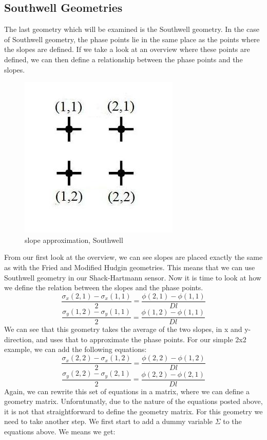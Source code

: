 \documentclass{article}
\begin{document}
\subsection{Southwell Geometries}
The last geometry which will be examined is the Southwell geometry. In the case of Southwell geometry, the phase points lie in the same place as the points where the slopes are defined. If we take a look at an overview where these points are defined, we can then define a relationship between the phase points and the slopes.
\newpage
\begin{figure}[h!]
  \centering
  \includegraphics[scale=0.6]{figures/southwell}
  \caption{slope approximation, Southwell}
\end{figure}
\noindent From our first look at the overview, we can see slopes are placed exactly the same as with the Fried and Modified Hudgin geometries. This means that we can use Southwell geometry in our Shack-Hartmann sensor. 
\newline
\newline
Now it is time to look at how we define the relation between the slopes and the phase points. 
$$ \frac{\sigma_x(2,1)-\sigma_x(1,1)}{2} = \frac{\phi(2,1)-\phi(1,1)}{Dl}$$
$$ \frac{\sigma_y(1,2)-\sigma_y(1,1)}{2} = \frac{\phi(1,2)-\phi(1,1)}{Dl}$$
We can see that this geometry takes the average of the two slopes, in x and y-direction, and uses that to approximate the phase points. For our simple 2x2 example, we can add the following equations:
$$ \frac{\sigma_x(2,2)-\sigma_x(1,2)}{2} = \frac{\phi(2,2)-\phi(1,2)}{Dl}$$
$$ \frac{\sigma_y(2,2)-\sigma_y(2,1)}{2} = \frac{\phi(2,2)-\phi(2,1)}{Dl}$$
Again, we can rewrite this set of equations in a matrix, where we can define a geometry matrix. 
Unforntunatly, due to the nature of the equations posted above, it is not that straightforward to define the geometry matrix. For this geometry we need to take another step. We first start to add a dummy variable $\varSigma$ to the equations above. We means we get:
\end{document}
